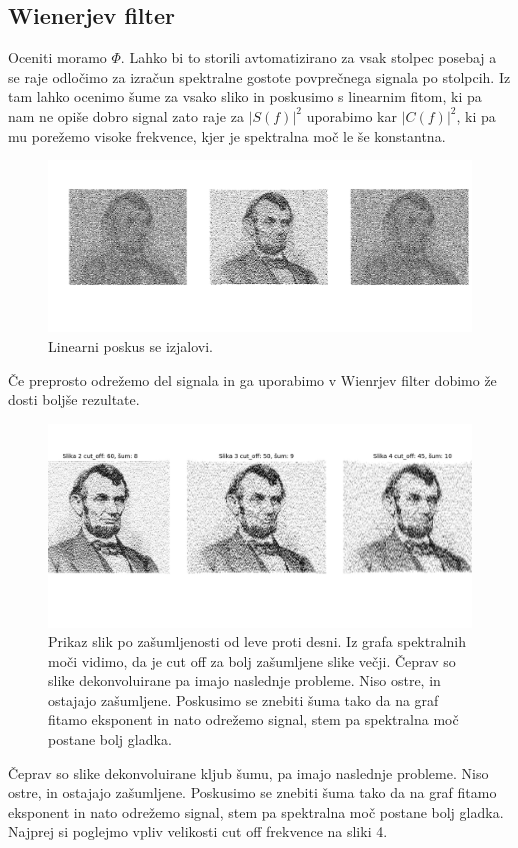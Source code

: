 \documentclass[11pt, a4paper]{article}
\begin{document}
\subsection{Wienerjev filter}
Oceniti moramo $\Phi$. Lahko bi to storili avtomatizirano za vsak stolpec posebaj a se raje odločimo za izračun spektralne gostote povprečnega signala po stolpcih. Iz tam lahko ocenimo šume za vsako sliko in poskusimo s linearnim fitom, ki pa nam ne opiše dobro signal zato raje za $|S(f)|^2$ uporabimo kar $|C(f)|^2$, ki pa mu porežemo visoke frekvence, kjer je spektralna moč le še konstantna.
\begin{figure}[H]

\includegraphics[width=16cm, ]{tretja_drugi5.png}
\caption{Linearni poskus se izjalovi.}  
\end{figure}
Če preprosto odrežemo del signala in ga uporabimo v Wienrjev filter dobimo že dosti boljše rezultate.
\begin{figure}[H]
\includegraphics[width=16cm, ]{tretja_tretji1.png}

\caption{Prikaz slik po zašumljenosti od leve proti desni. Iz grafa spektralnih moči vidimo, da je cut off za bolj zašumljene slike večji. Čeprav so slike dekonvoluirane pa imajo naslednje probleme. Niso ostre, in ostajajo zašumljene. Poskusimo se znebiti šuma tako da na graf fitamo eksponent in nato odrežemo signal, stem pa spektralna moč postane bolj gladka.}  
\end{figure}
Čeprav so slike dekonvoluirane kljub šumu, pa imajo naslednje probleme. Niso ostre, in ostajajo zašumljene. Poskusimo se znebiti šuma tako da na graf fitamo eksponent in nato odrežemo signal, stem pa spektralna moč postane bolj gladka. Najprej si poglejmo vpliv velikosti cut off frekvence na sliki 4.
\end{document}
